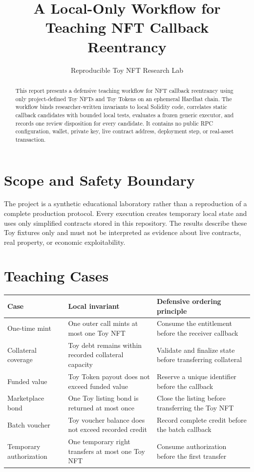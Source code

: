 \documentclass[11pt]{article}
\title{A Local-Only Workflow for Teaching NFT Callback Reentrancy}
\author{Reproducible Toy NFT Research Lab}
\date{}
\begin{document}
\maketitle

\begin{abstract}
This report presents a defensive teaching workflow for NFT callback reentrancy using only project-defined Toy NFTs and Toy Tokens on an ephemeral Hardhat chain. The workflow binds researcher-written invariants to local Solidity code, correlates static callback candidates with bounded local tests, evaluates a frozen generic executor, and records one review disposition for every candidate. It contains no public RPC configuration, wallet, private key, live contract address, deployment step, or real-asset transaction.
\end{abstract}

\section{Scope and Safety Boundary}

The project is a synthetic educational laboratory rather than a reproduction of a complete production protocol. Every execution creates temporary local state and uses only simplified contracts stored in this repository. The results describe these Toy fixtures only and must not be interpreted as evidence about live contracts, real property, or economic exploitability.

\section{Teaching Cases}

\begin{table}[h]
\centering
\small
\begin{tabularx}{\textwidth}{@{}lXX@{}}
\toprule
Case & Local invariant & Defensive ordering principle \\
\midrule
One-time mint & One outer call mints at most one Toy NFT & Consume the entitlement before the receiver callback \\
Collateral coverage & Toy debt remains within recorded collateral capacity & Validate and finalize state before transferring collateral \\
Funded value & Toy Token payout does not exceed funded value & Reserve a unique identifier before the callback \\
Marketplace bond & One Toy listing bond is returned at most once & Close the listing before transferring the Toy NFT \\
Batch voucher & Toy voucher balance does not exceed recorded credit & Record complete credit before the batch callback \\
Temporary authorization & One temporary right transfers at most one Toy NFT & Consume authorization before the first transfer \\
\bottomrule
\end{tabularx}
\end{table}
\end{document}
